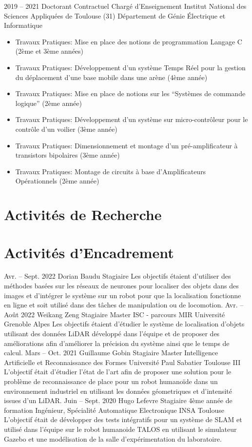 \documentclass[11pt,a4paper,sans]{moderncv}         %
\begin{document}
{2019 -- 2021}
{Doctorant Contractuel Charg\'e d'Enseignement}
{Institut National des Sciences Appliqu\'ees de Toulouse (31)}
{D\'epartement de G\'enie \'Electrique et Informatique}
{}
{
\begin{itemize}
  \item Travaux Pratiques: Mise en place des notions de programmation Langage C (2\`eme et 3\`eme ann\'ees)
  \item Travaux Pratiques: D\'eveloppement d'un syst\`eme Temps R\'eel pour la gestion du d\'eplacement d'une base mobile dans une ar\`ene (4\`eme ann\'ee)
  \item Travaux Pratiques: Mise en place de notions sur les ``Syst\`emes de commande logique'' (2\`eme ann\'ee)
  \item Travaux Pratiques: D\'eveloppement d'un syst\`eme sur micro-contr\^oleur pour le contr\^ole d'un voilier (3\`eme ann\'ee)
  \item Travaux Pratiques: Dimensionnement et montage d'un pr\'e-amplificateur \`a transistors bipolaires (3\`eme ann\'ee)
  \item Travaux Pratiques: Montage de circuits \`a base d'Amplificateurs Op\'erationnels (2\`eme ann\'ee)
\end{itemize}
}
%

\section{Activit\'es de Recherche}

\section{Activit\'es d'Encadrement}
\cventry
{Avr. -- Sept. 2022}
{Dorian Baudu}
{Stagiaire}
{}
{}
{
  Les objectifs \'etaient d'utiliser des m\'ethodes bas\'ees sur les r\'eseaux de neurones pour localiser des objets dans des images et d'int\'egrer le syst\`eme sur un robot pour que la localisation fonctionne en ligne et soit utilis\'e dans des t\^aches de manipulation ou de locomotion.
}
%
\cventry
{Avr. -- Ao\^ut 2022}
{Weikang Zeng}
{Stagiaire}
{Master ISC - parcours MIR}
{Universit\'e Grenoble Alpes}
{
  Les objectifs \'etaient d'\'etudier le syst\`eme de localisation d'objets utilisant des donn\'ees LiDAR d\'evelopp\'e dans l'\'equipe et de proposer des am\'eliorations afin d'am\'eliorer la pr\'ecision du syst\`eme ainsi que le temps de calcul.
}
%
\cventry
{Mars -- Oct. 2021}
{Guillaume Gobin}
{Stagiaire}
{Master Intelligence Artificielle et Reconnaissance des Formes}
{Universit\'e Paul Sabatier Toulouse III}
{
  L'objectif \'etait d'\'etudier l'\'etat de l'art afin de proposer une solution pour le probl\`eme de reconnaissance de place pour un robot humano\"ide dans un environnement industriel en utilisant les donn\'ees g\'eometriques et d'intensit\'e issues d'un LiDAR.
}
%
\cventry
{Juin -- Sept. 2020}
{Hugo Lefevre}
{Stagiaire}
{4\`eme ann\'ee de formation Ing\'enieur, Sp\'ecialit\'e Automatique Electronique}
{INSA Toulouse}
{
  L'objectif \'etait de d\'evelopper des tests int\'egratifs pour un syst\`eme de SLAM et utilis\'e dans l'\'equipe sur le robot humanoide TALOS en utilisant le simulateur Gazebo et une mod\'elisation de la salle d'exp\'erimentation du laboratoire.
}
%
\end{document}
